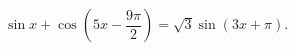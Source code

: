 \begin{ex}[type=equation]
	\begin{condition}
		$\ \sin x+\cos {\left(5x -\dfrac{9\pi}{2}\right)} = \sqrt{3}\sin {(3x + \pi)}. $
	\end{condition}
\end{ex}